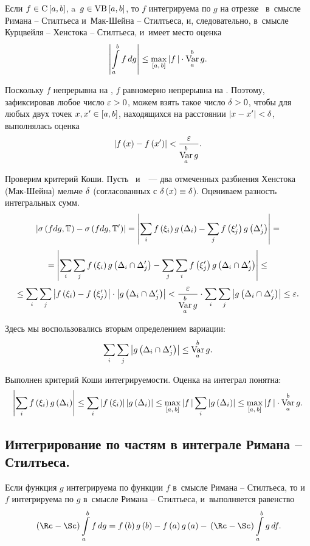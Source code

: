 \documentclass[draft]{article}
\begin{document}
\prlm

\bigskip


Если $f\isc\segab$, a~$g\isvb\segab$, то $f$ интегрируема по $g$ на
отрезке \ab\ в~смысле Римана -- Стилтьеса и~Мак-Шейна -- Стилтьеса,
и, следовательно, в~смысле Курцвейля -- Хенстока -- Стилтьеса,
и~имеет место оценка $$\abs{\intab
f,g}\le\max_{\seg[ a,\,b]}\abs{f\,}\cdot\var_a^bg.$$

\pr

Поскольку $f$ непрерывна на \ab, $f$ равномерно непрерывна на \ab.
Поэтому, зафиксировав любое число $\varepsilon > 0$, можем взять такое число
$\delta > 0$, чтобы для любых двух точек $x,x'\in\segab$, находящихся на
расстоянии $\left|x-x'\right|<\delta$, выполнялась оценка
$$\abs{f\atx-f\at(x')}<{\ep\over\var_a^bg}.$$

\smallskip

Проверим критерий Коши. Пусть \Tdixif\ и~\Tdjxjf\ --- два отмеченных
разбиения Хенстока (Мак-Шейна) мельче $\delta$ (согласованных с
$\dex\equiv\de$). Оцениваем разность интегральных сумм.
$$\abs{\isfdgT-\isfdgTp}=\abs{\sumi\fxigdi-\sumj\fxjgdj}=$$
\vskip -0.2cm
$$=\abs{\sumi\sumj f\at(\xii)g\at(\dei\cap\dej)-\sumj\sumi f\at(\xij)g\at(\dei\cap\dej)}\le$$
$$\le\sumi\sumj\abs{f\at(\xii)-f\at(\xij)}\cdot\abs{g\at(\dei\cap\dej)}<
{\ep\over\var_a^bg}\cdot\sumi\sumj\abs{g\at(\dei\cap\dej)}\le\ep.$$

\eject

Здесь мы воспользовались вторым определением вариации:
$$\sumi\sumj\abs{g\at(\dei\cap\dej)}\le\var_a^bg.$$

Выполнен критерий Коши интегрируемости. Оценка на интеграл понятна:
$$\abs{\sumi\fxigdi}\le\sumi\abs{f\at(\xii)}\abs{\gdei}\le\max_{\seg[ a,\,b]}\abs{f\,}\sumi\abs{\gdei}\le\max_{\seg[ a,\,b]}\abs{f\,}\cdot\var_a^bg.$$

\prtm

\subsection{Интегрирование по частям в интеграле Римана --
Стилтьеса.}


Если функция $g$ интегрируема по функции $f$ в~смысле Римана --
Стилтьеса, то и~$f$ интегрируема по $g$ в~смысле Римана --
Стилтьеса, и~выполняется равенство
$$\rimanst\intabfdg=f\at(b)g\at(b)-f\at(a)g\at(a)-\rimanst\intab g,f.$$
\end{document}
